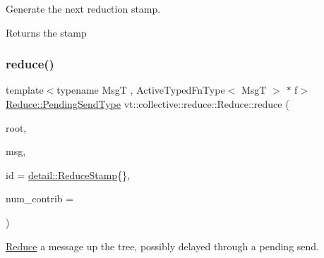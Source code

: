 Generate the next reduction stamp. 

\begin{DoxyReturn}{Returns}
the stamp 
\end{DoxyReturn}
\mbox{\label{structvt_1_1collective_1_1reduce_1_1_reduce_adf8bd9748a220a3ed29087c30f8adafc}} 
\subsubsection{\texorpdfstring{reduce()}{reduce()}\hspace{0.1cm}{\footnotesize\ttfamily [1/3]}}
{\footnotesize\ttfamily template$<$typename MsgT , Active\+Typed\+Fn\+Type$<$ Msg\+T $>$ $\ast$ f$>$ \\
\hyperlink{structvt_1_1collective_1_1reduce_1_1_reduce_a0474b491f3c93014d9a0ce0356c6bfd5}{Reduce\+::\+Pending\+Send\+Type} vt\+::collective\+::reduce\+::\+Reduce\+::reduce (\begin{DoxyParamCaption}\item[{\hyperlink{namespacevt_a866da9d0efc19c0a1ce79e9e492f47e2}{Node\+Type}}]{root,  }\item[{MsgT $\ast$const}]{msg,  }\item[{\hyperlink{namespacevt_1_1collective_1_1reduce_1_1detail_aacc1fcd729d934ba143fee3a943bf9e7}{detail\+::\+Reduce\+Stamp}}]{id = {\ttfamily \hyperlink{namespacevt_1_1collective_1_1reduce_1_1detail_aacc1fcd729d934ba143fee3a943bf9e7}{detail\+::\+Reduce\+Stamp}\{\}},  }\item[{\hyperlink{structvt_1_1collective_1_1reduce_1_1_reduce_a6c3e63aca10c31d2823b0b18cf9762a4}{Reduce\+Num\+Type}}]{num\+\_\+contrib = {} }\end{DoxyParamCaption})}



\hyperlink{structvt_1_1collective_1_1reduce_1_1_reduce}{Reduce} a message up the tree, possibly delayed through a pending send. 


